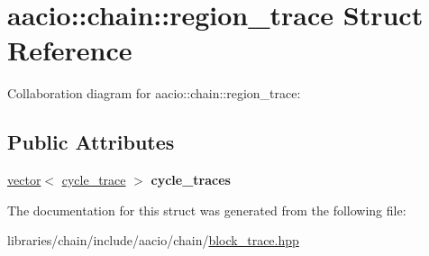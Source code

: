 \hypertarget{structaacio_1_1chain_1_1region__trace}{}\section{aacio\+:\+:chain\+:\+:region\+\_\+trace Struct Reference}
\label{structaacio_1_1chain_1_1region__trace}


Collaboration diagram for aacio\+:\+:chain\+:\+:region\+\_\+trace\+:
\subsection*{Public Attributes}
\begin{DoxyCompactItemize}
\item 
\mbox{\label{structaacio_1_1chain_1_1region__trace_a3f96bb297ef0795bad947d6985630c9d}} 
\mbox{\hyperlink{classstd_1_1vector}{vector}}$<$ \mbox{\hyperlink{structaacio_1_1chain_1_1cycle__trace}{cycle\+\_\+trace}} $>$ {\bfseries cycle\+\_\+traces}
\end{DoxyCompactItemize}


The documentation for this struct was generated from the following file\+:\begin{DoxyCompactItemize}
\item 
libraries/chain/include/aacio/chain/\mbox{\hyperlink{block__trace_8hpp}{block\+\_\+trace.\+hpp}}\end{DoxyCompactItemize}
